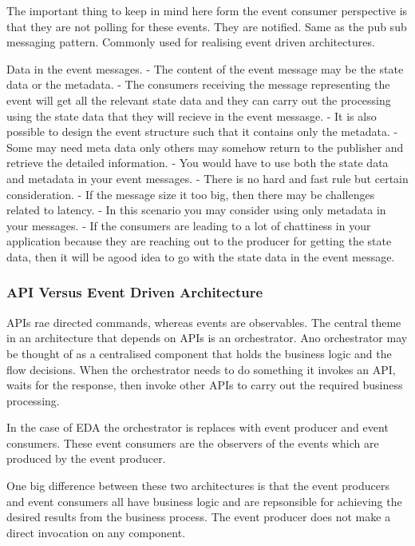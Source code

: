 \documentclass[a4paper, 11pt]{book}
\begin{document}
{    The important thing to keep in mind here form the event consumer perspective is that they are not polling for these events. They are notified.
    Same as the pub sub messaging pattern.
    Commonly used for realising event driven architectures.

    Data in the event messages.
    - The content of the event message may be the state data or the metadata.
    - The consumers receiving the message representing the event will get all the relevant state data and they can carry out the processing using the state data that they will recieve in the event messasge.
    - It is also possible to design the event structure such that it contains only the metadata.
    - Some may need meta data only others may somehow return to the publisher and retrieve the detailed information.
    - You would have to use both the state data and metadata in your event messages.
        - There is no hard and fast rule but certain consideration.
        - If the message size it too big, then there may be challenges related to latency.
            - In this scenario you may consider using only metadata in your messages.
    - If the consumers are leading to a lot of chattiness in your application because they are reaching out to the producer for getting the state data, then it will be agood idea to go with the state data in the event message.

    \subsubsection{API Versus Event Driven Architecture}
    APIs rae directed commands, whereas events are observables.
    The central theme in an architecture that depends on APIs is an orchestrator.
    Ano orchestrator may be thought of as a centralised component that holds the business logic and the flow decisions.
    When the orchestrator needs to do something it invokes an API, waits for the response, then invoke other APIs to carry out the required business processing.

    In the case of EDA the orchestrator is replaces with event producer and event consumers.
    These event consumers are the observers of the events which are produced by the event producer.

    One big difference between these two architectures is that the event producers and event consumers all have business logic and are repsonsible for achieving the desired results from the business process.
    The event producer does not make a direct invocation on any component.

}
\end{document}
